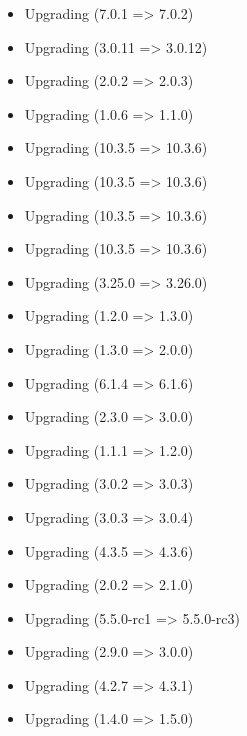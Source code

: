     \begin{itemize}
        \item Upgrading  (7.0.1 => 7.0.2)
        \item Upgrading  (3.0.11 => 3.0.12)
        \item Upgrading  (2.0.2 => 2.0.3)
        \item Upgrading  (1.0.6 => 1.1.0)
        \item Upgrading  (10.3.5 => 10.3.6)
        \item Upgrading  (10.3.5 => 10.3.6)
        \item Upgrading  (10.3.5 => 10.3.6)
        \item Upgrading  (10.3.5 => 10.3.6)
        \item Upgrading  (3.25.0 => 3.26.0)
        \item Upgrading  (1.2.0 => 1.3.0)
        \item Upgrading  (1.3.0 => 2.0.0)
        \item Upgrading  (6.1.4 => 6.1.6)
        \item Upgrading  (2.3.0 => 3.0.0)
        \item Upgrading  (1.1.1 => 1.2.0)
        \item Upgrading  (3.0.2 => 3.0.3)
        \item Upgrading  (3.0.3 => 3.0.4)
        \item Upgrading  (4.3.5 => 4.3.6)
        \item Upgrading  (2.0.2 => 2.1.0)
        \item Upgrading  (5.5.0-rc1 => 5.5.0-rc3)
        \item Upgrading  (2.9.0 => 3.0.0)
        \item Upgrading  (4.2.7 => 4.3.1)
        \item Upgrading  (1.4.0 => 1.5.0)
    \end{itemize}

